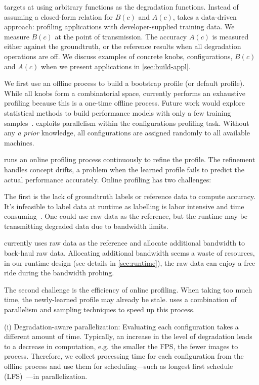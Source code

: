 \sysname{} targets at using arbitrary functions as the degradation
functions. Instead of assuming a closed-form relation for $B(c)$ and $A(c)$,
\sysname{} takes a data-driven approach: profiling applications with
developer-supplied training data.  We measure $B(c)$ at the point of
transmission. The accuracy $A(c)$ is measured either against the groundtruth, or
the reference results when all degradation operations are off.  We discuss
examples of concrete knobs, configurations, $B(c)$ and $A(c)$ when we present
applications in \autoref{sec:build-appl}.

 We first use an offline process to build a bootstrap
profile (or default profile). While all knobs form a combinatorial space,
\sysname{} currently performs an exhaustive profiling because this is a one-time
offline process. Future work would explore statistical methods to build
performance models with only a few training
samples~\cite{venkataraman2016ernest}. \sysname{} exploits parallelism within
the configurations profiling task. Without any \textit{a prior} knowledge, all
configurations are assigned randomly to all available machines.

 \sysname{} runs an online profiling process
continuously to refine the profile. The refinement handles concept drifts, a
problem when the learned profile fails to predict the actual performance
accurately. Online profiling has two challenges:

The first is the lack of groundtruth labels or reference data to compute
accuracy. It's infeasible to label data at runtime as labelling is labor
intensive and time consuming~\cite{russell2008labelme}. One could use raw data
as the reference, but the runtime may be transmitting degraded data due to
bandwidth limits.

\sysname{} currently uses raw data as the reference and allocate additional
bandwidth to back-haul raw data. Allocating additional bandwidth seems a waste
of resources, in our runtime design (see details in \autoref{sec:runtime}), the
raw data can enjoy a free ride during the bandwidth probing.

The second challenge is the efficiency of online profiling. When taking too much
time, the newly-learned profile may already be stale. \sysname{} uses a
combination of parallelism and sampling techniques to speed up this process.

(i) Degradation-aware parallelization: Evaluating each configuration takes a
different amount of time. Typically, an increase in the level of degradation
leads to a decrease in computation, e.g. the smaller the FPS, the fewer images
to process. Therefore, we collect processing time for each configuration from
the offline process and use them for scheduling---such as longest first schedule
(LFS)~\cite{karger2010scheduling}---in parallelization.

